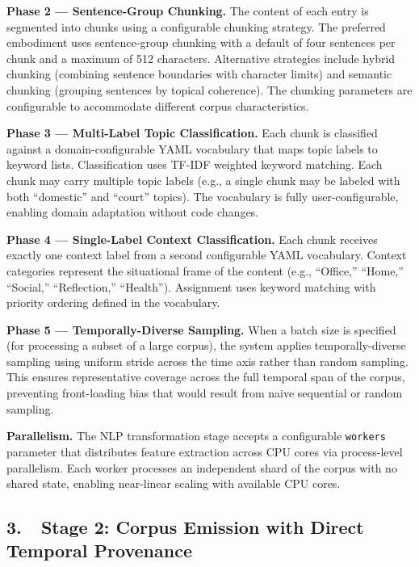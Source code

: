 \documentclass[12pt,letterpaper]{article}
\begin{document}
\textbf{Phase 2 --- Sentence-Group Chunking.} The content of each entry is segmented
into chunks using a configurable chunking strategy. The preferred embodiment uses
sentence-group chunking with a default of four sentences per chunk and a maximum of 512
characters. Alternative strategies include hybrid chunking (combining sentence
boundaries with character limits) and semantic chunking (grouping sentences by topical
coherence). The chunking parameters are configurable to accommodate different corpus
characteristics.

\textbf{Phase 3 --- Multi-Label Topic Classification.} Each chunk is classified against
a domain-configurable YAML vocabulary that maps topic labels to keyword lists.
Classification uses TF-IDF weighted keyword matching. Each chunk may carry multiple
topic labels (e.g., a single chunk may be labeled with both ``domestic'' and ``court''
topics). The vocabulary is fully user-configurable, enabling domain adaptation without
code changes.

\textbf{Phase 4 --- Single-Label Context Classification.} Each chunk receives exactly
one context label from a second configurable YAML vocabulary. Context categories
represent the situational frame of the content (e.g., ``Office,'' ``Home,'' ``Social,''
``Reflection,'' ``Health''). Assignment uses keyword matching with priority ordering
defined in the vocabulary.

\textbf{Phase 5 --- Temporally-Diverse Sampling.} When a batch size is specified (for
processing a subset of a large corpus), the system applies temporally-diverse sampling
using uniform stride across the time axis rather than random sampling. This ensures
representative coverage across the full temporal span of the corpus, preventing
front-loading bias that would result from naive sequential or random sampling.

\textbf{Parallelism.} The NLP transformation stage accepts a configurable
\texttt{workers} parameter that distributes feature extraction across CPU cores via
process-level parallelism. Each worker processes an independent shard of the corpus
with no shared state, enabling near-linear scaling with available CPU cores.

\subsection*{3.\ \ Stage 2: Corpus Emission with Direct Temporal Provenance}
\end{document}
